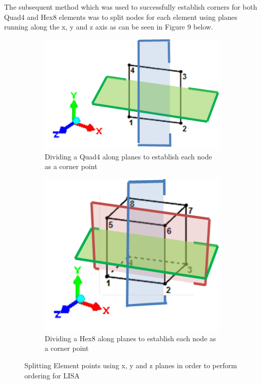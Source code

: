 \noindent
The subsequent method which was used to successfully establish corners for both Quad4 and Hex8 elements was to split nodes for each element using planes running along the x, y and z axis as can be seen in Figure 9 below.

\begin{figure}[!h]
\centering
\begin{subfigure}{.5\textwidth}
  \centering
  \includegraphics[width=0.9\linewidth]{../Graphics/SortingQuad4.png}
  \caption{Dividing a Quad4 along planes to establish each node as a corner point}
  \label{fig:sub1}
\end{subfigure}%
\begin{subfigure}{.5\textwidth}
  \centering
  \includegraphics[width=0.7\linewidth]{../Graphics/SortingHex8.png}
  \caption{Dividing a Hex8 along planes to establish each node as a corner point}
  \label{fig:sub2}
\end{subfigure}
\caption{Splitting Element points using x, y and z planes in order to perform ordering for LISA}
\label{fig:test}
\end{figure}

